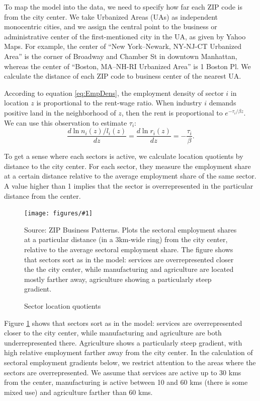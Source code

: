 \documentclass[12pt]{article}
\newcommand{\dofigure}[3]{\begin{figure}
\begin{centering}
\texttt{[image: figures/\#1]}
  \caption{#2\label{fig:#1}}
\end{centering}

\noindent \footnotesize{#3}
\end{figure}}
\begin{document}
To map the model into the data, we need to specify how far each ZIP code is from the city center. We take Urbanized Areas (UAs) as independent monocentric cities, and we assign the central point to the business or administrative center of the first-mentioned city in the UA, as given by Yahoo Maps. For example, the center of ``New York–Newark, NY-NJ-CT Urbanized Area'' is the corner of Broadway and Chamber St in downtown Manhattan, whereas the center of ``Boston, MA–NH-RI Urbanized Area'' is 1 Boston Pl. We calculate the distance of each ZIP code to business center of the nearest UA.

According to equation \ref{eq:EmpDens}, the employment density of sector $i$ in location $z$ is proportional to the rent-wage ratio. When industry $i$ demands positive land in the neighborhood of $z$, then the rent is proportional to $e^{-\tau_i/\beta z}$. We can use this observation to estimate $\tau_i$:
\[
\frac{d\ln n_i(z)/l_i(z)}{dz} =\frac{d\ln r_i(z)}{dz} = -\frac{\tau_i}{\beta}.
\]

To get a sense where each sectors is active, we calculate location quotients by distance to the city center. For each sector, they measure the employment share at a certain distance relative to the average employment share of the same sector. A value higher than 1 implies that the sector is overrepresented in the particular distance from the center.

\dofigure{sector_location_quotients}{Sector location quotients}{Source: ZIP Business Patterns. Plots the sectoral employment shares at a particular distance (in a 3km-wide ring) from the city center, relative to the average sectoral employment share. The figure shows that sectors sort as in the model: services are overrepresented closer the the city center, while manufacturing and agriculture are located mostly farther away, agriculture showing a particularly steep gradient.}

Figure \ref{fig:sector_location_quotients} shows that sectors sort as in the model: services are overrepresented closer to the city center, while manufacturing and agriculture are both underrepresented there. Agriculture shows a particularly steep gradient, with high relative employment farther away from the city center. In the calculation of sectoral employment gradients below, we restrict attention to the areas where the sectors are overrepresented. We assume that services are active up to 30 kms from the center, manufacturing is active between 10 and 60 kms (there is some mixed use) and agriculture farther than 60 kms.
\end{document}
